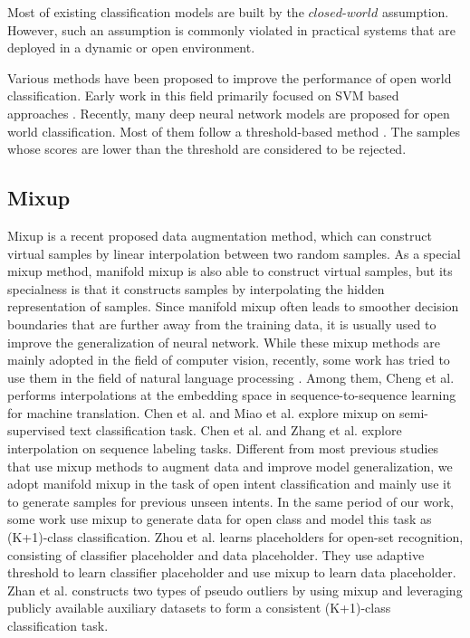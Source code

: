 \documentclass[journal]{IEEEtran}
\begin{document}
Most of existing classification models are built by the $closed$-$world$ assumption.
However, such an assumption is commonly violated in practical systems that are deployed in a dynamic or open environment.

Various methods have been proposed to improve the performance of open world classification.
Early work in this field primarily focused on SVM based approaches \cite{DBLP:conf/nips/ScholkopfWSSP99,DBLP:journals/pami/ScheirerRSB13,DBLP:conf/eccv/JainSB14,DBLP:journals/pami/ScheirerJB14}.
Recently, many deep neural network models are proposed for open world classification.
Most of them follow a threshold-based method \cite{DBLP:conf/naacl/Fei016,Hendrycks17,Shu17,DBLP:conf/iclr/LiangLS18}.
The samples whose scores are lower than the threshold are considered to be rejected.
\fi

\subsection{Mixup}
Mixup \cite{ZhangCDL18} is a recent proposed data augmentation method, which can construct virtual samples by linear interpolation between two random samples.
As a special mixup method, manifold mixup \cite{DBLP:conf/icml/VermaLBNMLB19} is also able to construct virtual samples, but its specialness is that it constructs samples by interpolating the hidden representation of samples.
Since manifold mixup often leads to smoother decision boundaries that are further away from the training data, it is usually used to improve the generalization of neural network.
While these mixup methods are mainly adopted in the field of computer vision, recently, some work has tried to use them in the field of natural language processing \cite{DBLP:conf/acl/ChengJME20,DBLP:conf/acl/ChenYY20,DBLP:conf/emnlp/ZhangYZ20,DBLP:conf/emnlp/ChenWTYY20,DBLP:conf/www/MiaoLWT20}.
Among them, Cheng et al. \cite{DBLP:conf/acl/ChengJME20} performs interpolations at the embedding space in sequence-to-sequence learning for machine translation.
Chen et al. \cite{DBLP:conf/acl/ChenYY20} and Miao et al. \cite{DBLP:conf/www/MiaoLWT20} explore mixup on semi-supervised text classification task.
Chen et al. \cite{DBLP:conf/emnlp/ChenWTYY20} and Zhang et al. \cite{DBLP:conf/emnlp/ZhangYZ20} explore interpolation on sequence labeling tasks.
Different from most previous studies that use mixup methods to augment data and improve model generalization, we adopt manifold mixup in the task of open intent classification and mainly use it to generate samples for previous unseen intents.
In the same period of our work, some work \cite{DBLP:conf/cvpr/ZhouYZ21,DBLP:conf/acl/ZhanLLFWL21} use mixup to generate data for open class and model this task as (K+1)-class classification.
Zhou et al. \cite{DBLP:conf/cvpr/ZhouYZ21} learns placeholders for open-set recognition, consisting of classifier placeholder and data placeholder.
They use adaptive threshold to learn classifier placeholder and use mixup to learn data placeholder.
Zhan et al. \cite{DBLP:conf/acl/ZhanLLFWL21} constructs two types of pseudo outliers by using mixup and leveraging publicly available auxiliary datasets to form a consistent (K+1)-class classification task.
\end{document}
